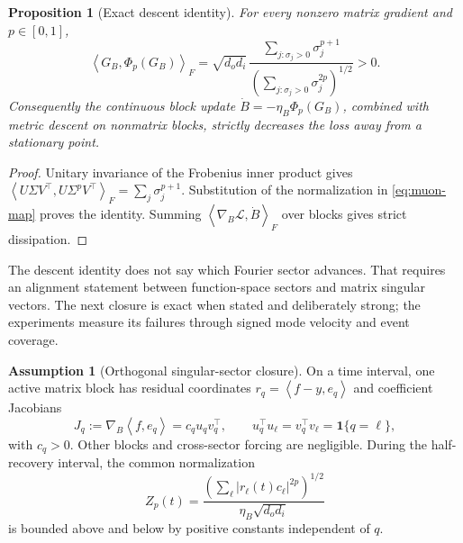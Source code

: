 \documentclass[11pt]{article}
\newcommand{\1}{\mathbf 1}
\newcommand{\ip}[2]{\left\langle #1,#2\right\rangle}
\newcommand{\cL}{\mathcal L}
\theoremstyle{plain}
\newtheorem{proposition}[theorem]{Proposition}
\theoremstyle{definition}
\newtheorem{assumption}[theorem]{Assumption}
\begin{document}
\begin{proposition}[Exact descent identity]
\label{prop:muon-descent}
For every nonzero matrix gradient and \(p\in[0,1]\),
\begin{equation}
 \ip{G_B}{\Phi_p(G_B)}_F
 =\sqrt{d_od_i}\,
 \frac{\sum_{j:\sigma_j>0}\sigma_j^{p+1}}
 {(\sum_{j:\sigma_j>0}\sigma_j^{2p})^{1/2}}>0.
 \label{eq:muon-descent}
\end{equation}
Consequently the continuous block update
\(\dot B=-\eta_B\Phi_p(G_B)\), combined with metric descent on nonmatrix
blocks, strictly decreases the loss away from a stationary point.
\end{proposition}

\begin{proof}
Unitary invariance of the Frobenius inner product gives
\(\ip{U\Sigma V^\top}{U\Sigma^pV^\top}_F
=\sum_j\sigma_j^{p+1}\).  Substitution of the normalization in
\eqref{eq:muon-map} proves the identity.  Summing
\(\ip{\nabla_B\cL}{\dot B}_F\) over blocks gives strict dissipation.
\end{proof}

The descent identity does not say which Fourier sector advances.  That
requires an alignment statement between function-space sectors and matrix
singular vectors.  The next closure is exact when stated and deliberately
strong; the experiments measure its failures through signed mode velocity
and event coverage.

\begin{assumption}[Orthogonal singular-sector closure]
\label{ass:singular-sectors}
On a time interval, one active matrix block has residual coordinates
\(r_q=\ip{f-y}{e_q}\) and coefficient Jacobians
\begin{equation}
 J_q:=\nabla_B\ip{f}{e_q}=c_q u_qv_q^\top,
 \qquad
 u_q^\top u_\ell=v_q^\top v_\ell=\1\{q=\ell\},
 \label{eq:sector-jacobian}
\end{equation}
with \(c_q>0\).  Other blocks and cross-sector forcing are negligible.
During the half-recovery interval, the common normalization
\begin{equation}
 Z_p(t)=\frac{(\sum_\ell|r_\ell(t)c_\ell|^{2p})^{1/2}}
 {\eta_B\sqrt{d_od_i}}
 \label{eq:sector-normalization}
\end{equation}
is bounded above and below by positive constants independent of \(q\).
\end{assumption}
\end{document}
